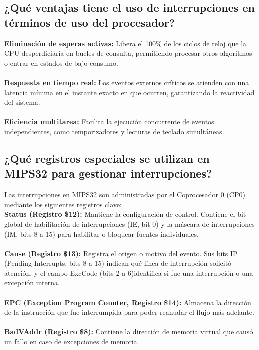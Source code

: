 \documentclass[12pt, a4paper]{article}
\begin{document}
\subsection{¿Qué ventajas tiene el uso de interrupciones en términos de uso del procesador?}
    \textbf{Eliminación de esperas activas:} Libera el 100\% de los ciclos de reloj que la CPU desperdiciaría en bucles de consulta, permitiendo procesar otros algoritmos o entrar en estados de bajo consumo.\\\\
    \textbf{Respuesta en tiempo real:} Los eventos externos críticos se atienden con una latencia mínima en el instante exacto en que ocurren, garantizando la reactividad del sistema.\\\\
    \textbf{Eficiencia multitarea:} Facilita la ejecución concurrente de eventos independientes, como temporizadores y lecturas de teclado simultáneas.\\

\subsection{¿Qué registros especiales se utilizan en MIPS32 para gestionar interrupciones?}
    Las interrupciones en MIPS32 son administradas por el Coprocesador 0 (CP0) mediante los siguientes registros clave:\\
    \textbf{Status (Registro \$12):} Mantiene la configuración de control. Contiene el bit global de habilitación de interrupciones (IE, bit 0) y la máscara de interrupciones (IM, bits 8 a 15) para habilitar o bloquear fuentes individuales.\\\\
    \textbf{Cause (Registro \$13):} Registra el origen o motivo del evento. Sus bits IP (Pending Interrupts, bits 8 a 15) indican qué línea de interrupción solicitó atención, y el campo ExcCode (bits 2 a 6)identifica si fue una interrupción o una excepción interna.\\\\
    \textbf{EPC (Exception Program Counter, Registro \$14):} Almacena la dirección de la instrucción que fue interrumpida para poder reanudar el flujo más adelante.\\\\
    \textbf{BadVAddr (Registro \$8):} Contiene la dirección de memoria virtual que causó un fallo en caso de excepciones de memoria.\\\\
\end{document}
